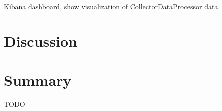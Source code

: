 Kibana dashboard, show visualization of CollectorDataProcessor data

\section{Discussion}
\section{Summary}

TODO

